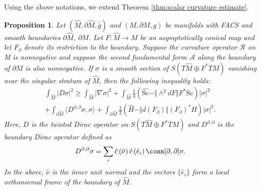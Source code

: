 \documentclass[12pt, reqno]{amsart}
\theoremstyle{plain} %
\newtheorem{proposition}[theorem]{Proposition}
\theoremstyle{definition}
\theoremstyle{remark}
\numberwithin{equation}{section}
\newcommand{\dom}[1]{\hat{#1}}
\newcommand{\onorm}[1]{\Vert #1 \Vert}
\newcommand{\pnorm}[1]{| #1 |}
\newcommand{\bnd}[1]{\partial #1}
\newcommand{\cbar}[1]{\dom{c}\left(#1\right)}
\newcommand{\Sc}{\mathrm{Sc}}
\newcommand{\inner}[1]{\langle #1 \rangle}
\begin{document}
Using the above notations, we extend Theorem \ref{thm:scalar curvature estimate}.
\begin{proposition}\label{prop:scalar-mean curvature estimate}
    Let \((\dom{M}, \bnd{\dom{M}}, \dom{g})\) and \((M, \bnd{M}, g)\) be manifolds with FACS and smooth boundaries \(\bnd{\dom{M}}\), \(\bnd{M}\).
    Let \(F\colon \dom{M} \to M\) be an asymptotically conical map and let \(F_\partial\) denote its restriction to the boundary.
    Suppose the curvature operator \(\mathcal{R}\) on M is nonnegative and suppose the second fundamental form \(\mathcal{A}\) along the boundary of \(\bnd{M}\) is also nonnegative.
    If \(\sigma\) is a smooth section of \(S(T\dom{M} \oplus F^*TM)\) vanishing near the singular stratum of \(\dom{M}\), then the following inequality holds:
    \begin{multline}
        \int_{\dom{M}}\pnorm{D\sigma}^2\geq \int_{\dom{M}}\pnorm{\nabla \sigma}^2+\int_{\dom{M}} \frac{1}{4}(\dom{\Sc}-\onorm{\wedge^2dF}F^*\Sc )\pnorm{\sigma}^2\\
        + \int_{\bnd{\dom{M}}} \inner{D^{\partial, \partial} \sigma, \sigma} + \int_{\bnd{\dom{M}}} \frac{1}{2} (\dom{H} - \onorm{d(F_\partial)} (F_\partial)^*H )\pnorm{\sigma}^2.
    \end{multline}
    Here, \(D\) is the twisted Dirac operator on \(S(T\dom{M} \oplus F^*TM)\)  and \(D^{\partial, \partial}\) is the boundary Dirac operator defined as
    \begin{equation*}
        D^{\partial, \partial} \sigma = \sum_i \cbar{\dom{\nu}}\cbar{\dom{e}_i} \conn[\partial, \partial] \sigma.
    \end{equation*}
    In the above, \(\dom{\nu}\) is the inner unit normal and the vectors \(\{\dom{e}_i\}\) form a local orthonormal frame of the boundary of \(\dom{M}\).
\end{proposition}
\end{document}
